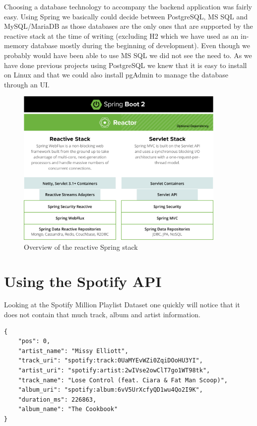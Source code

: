 Choosing a database technology to accompany the backend application was fairly easy. Using Spring we basically could decide between PostgreSQL, MS SQL and MySQL/MariaDB as those databases are the only ones that are supported by the reactive stack at the time of writing (excluding H2 which we have used as an in-memory database mostly during the beginning of development). Even though we probably would have been able to use MS SQL we did not see the need to. As we have done previous projects using PostgreSQL we knew that it is easy to install on Linux and that we could also install pgAdmin to manage the database through an UI.

\begin{figure}[bth]
    \centering
    \includegraphics[width=0.9\textwidth]{Graphics/Chapter2/spring-stack.png}
    \caption{Overview of the reactive Spring stack \cite{SpringReactive}}
\end{figure}

\section{Using the Spotify API}

Looking at the Spotify Million Playlist Dataset one quickly will notice that it does not contain that much track, album and artist information.

\begin{lstlisting}[caption={Excerpt of one track entry in the Spotify Million Playlist Dataset}, style=Terminal]
{
    "pos": 0,
    "artist_name": "Missy Elliott",
    "track_uri": "spotify:track:0UaMYEvWZi0ZqiDOoHU3YI",
    "artist_uri": "spotify:artist:2wIVse2owClT7go1WT98tk",
    "track_name": "Lose Control (feat. Ciara & Fat Man Scoop)",
    "album_uri": "spotify:album:6vV5UrXcfyQD1wu4Qo2I9K",
    "duration_ms": 226863,
    "album_name": "The Cookbook"
}
\end{lstlisting}

